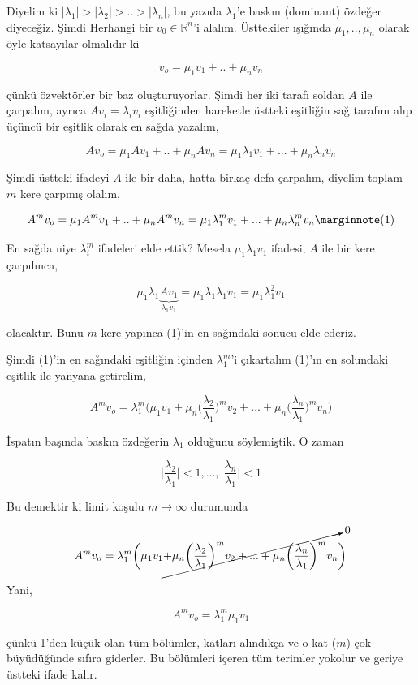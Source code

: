 \documentclass[12pt,fleqn]{article}\usepackage{../../common}
\begin{document}
Diyelim ki $|\lambda_1| > |\lambda_2| > .. > |\lambda_n| $, bu yazıda
$\lambda_1$'e baskın (dominant) özdeğer diyeceğiz. Şimdi Herhangi bir $v_0 \in
\mathbb{R}^n$'i alalım.  Üsttekiler ışığında $\mu_1,..,\mu_n$ olarak öyle
katsayılar olmalıdır ki

$$ v_o = \mu_1v_1 + .. + \mu_nv_n 
$$

çünkü özvektörler bir baz oluşturuyorlar. Şimdi her iki tarafı soldan $A$ ile
çarpalım, ayrıca $Av_i = \lambda_iv_i$ eşitliğinden hareketle üstteki eşitliğin
sağ tarafını alıp üçüncü bir eşitlik olarak en sağda yazalım,

$$ A v_o = \mu_1 A v_1 + .. + \mu_n A v_n =
\mu_1\lambda_1v_1 + ... + \mu_n\lambda_nv_n
$$

Şimdi üstteki ifadeyi $A$ ile bir daha, hatta birkaç defa çarpalım, diyelim
toplam $m$ kere çarpmış olalım,


$$
A^m v_o = \mu_1 A^m v_1 + .. + \mu_n A^m v_n =
\mu_1\lambda_1^mv_1 + ... + \mu_n\lambda_n^mv_n
\mlabel{1}
$$

En sağda niye $\lambda_i^m$ ifadeleri elde ettik? Mesela $\mu_1\lambda_1v_1$
ifadesi, $A$ ile bir kere çarpılınca,

$$
\mu_1\lambda_1\underbrace{Av_1}_{\lambda_1v_1} =
\mu_1\lambda_1\lambda_1v_1 = 
\mu_1\lambda_1^2v_1 
$$

olacaktır. Bunu $m$ kere yapınca (1)'in en sağındaki sonucu elde ederiz.

Şimdi (1)'in en sağındaki eşitliğin içinden $\lambda_1^m$'i çıkartalım (1)'ın en
solundaki eşitlik ile yanyana getirelim,

$$
A^m v_o = 
\lambda_1^m \bigg(  
\mu_1v_1 
+ \mu_n \bigg(\frac{\lambda_2}{\lambda_1}\bigg)^m v_2
+ ... 
+ \mu_n \bigg(\frac{\lambda_n}{\lambda_1}\bigg)^m v_n
\bigg)
$$

İspatın başında baskın özdeğerin $\lambda_1$ olduğunu söylemiştik. O zaman 

$$ 
\bigg| \frac{\lambda_2}{\lambda_1} \bigg| < 1, ..., 
\bigg| \frac{\lambda_n}{\lambda_1} \bigg| < 1
 $$

Bu demektir ki limit koşulu $m \to \infty$ durumunda

$$
A^m v_o = 
\lambda_1^m \bigg(  
\mu_1v_1 
\cancelto{0}
{
+ \mu_n \bigg(\frac{\lambda_2}{\lambda_1}\bigg)^m v_2
+ ... 
+ \mu_n \bigg(\frac{\lambda_n}{\lambda_1}\bigg)^m v_n
}
\bigg)
$$

Yani,

$$
A^m v_o = \lambda_1^m  \mu_1v_1 
$$

çünkü 1'den küçük olan tüm bölümler, katları alındıkça ve o kat ($m$) çok
büyüdüğünde sıfıra giderler. Bu bölümleri içeren tüm terimler yokolur ve geriye
üstteki ifade kalır.
\end{document}
